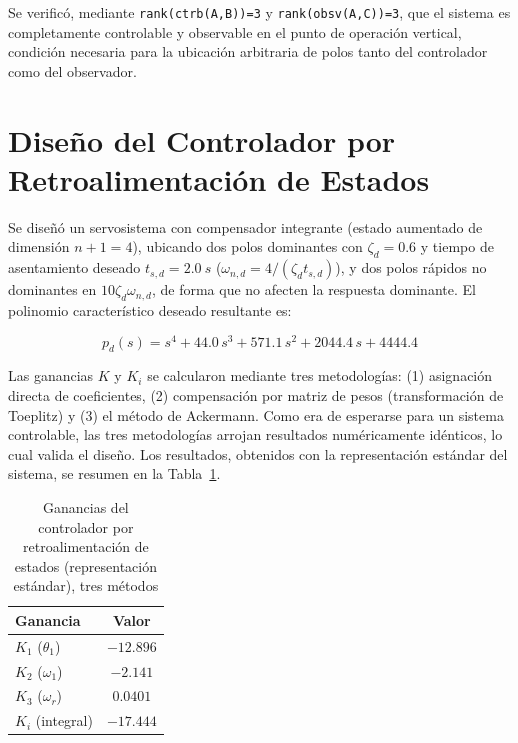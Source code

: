 \documentclass[conference]{IEEEtran}
\begin{document}
Se verificó, mediante \texttt{rank(ctrb(A,B))=3} y \texttt{rank(obsv(A,C))=3}, que el sistema es completamente controlable y observable en el punto de operación vertical, condición necesaria para la ubicación arbitraria de polos tanto del controlador como del observador.

\section{Diseño del Controlador por Retroalimentación de Estados}
\label{sec:controlador}

Se diseñó un servosistema con compensador integrante (estado aumentado de dimensión $n+1=4$), ubicando dos polos dominantes con $\zeta_d=0.6$ y tiempo de asentamiento deseado $t_{s,d}=\SI{2.0}{s}$ ($\omega_{n,d}=4/(\zeta_d t_{s,d})$), y dos polos rápidos no dominantes en $10\zeta_d\omega_{n,d}$, de forma que no afecten la respuesta dominante. El polinomio característico deseado resultante es:

\begin{equation}
p_d(s) = s^4 + 44.0\,s^3 + 571.1\,s^2 + 2044.4\,s + 4444.4
\end{equation}

Las ganancias $K$ y $K_i$ se calcularon mediante tres metodologías: (1) asignación directa de coeficientes, (2) compensación por matriz de pesos (transformación de Toeplitz) y (3) el método de Ackermann. Como era de esperarse para un sistema controlable, las tres metodologías arrojan resultados numéricamente idénticos, lo cual valida el diseño. Los resultados, obtenidos con la representación estándar del sistema, se resumen en la Tabla~\ref{tab:controlador}.

\begin{table}[H]
\centering
\caption{Ganancias del controlador por retroalimentación de estados (representación estándar), tres métodos}
\label{tab:controlador}
\renewcommand{\arraystretch}{1.3}
\begin{tabular}{|l|c|}
\hline
\textbf{Ganancia} & \textbf{Valor} \\
\hline
$K_1$ ($\theta_1$) & $-12.896$ \\
\hline
$K_2$ ($\omega_1$) & $-2.141$ \\
\hline
$K_3$ ($\omega_r$) & $0.0401$ \\
\hline
$K_i$ (integral) & $-17.444$ \\
\hline
\end{tabular}
\end{table}
\end{document}
